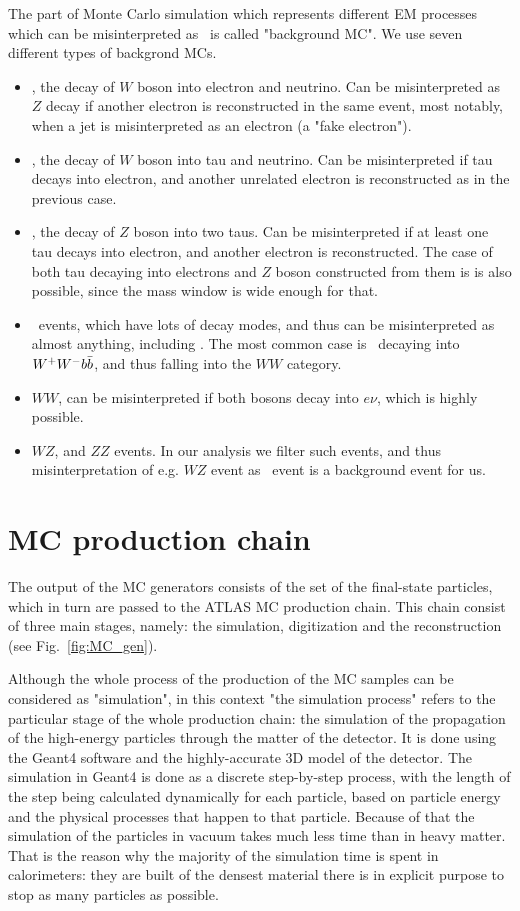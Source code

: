 The part of Monte Carlo simulation which represents different EM processes which can be misinterpreted as \Zee\ is called "background MC". We use seven different types of backgrond MCs.
\begin{itemize}
\item \Wen, the decay of $W$ boson into electron and neutrino. Can be misinterpreted as $Z$ decay if another electron is reconstructed in the same event, most notably, when a jet is misinterpreted as an electron (a "fake electron").
\item \Wtau, the decay of $W$ boson into tau and neutrino. Can be misinterpreted if tau decays into electron, and another unrelated electron is reconstructed as in the previous case.
\item \Ztau, the decay of $Z$ boson into two taus. Can be misinterpreted if at least one tau decays into electron, and another electron is reconstructed. The case of both tau decaying into electrons and $Z$ boson constructed from them is is also possible, since the mass window is wide enough for that.
\item \ttbar\ events, which have lots of decay modes, and thus can be misinterpreted as almost anything, including \Zee. The most common case is \ttbar\ decaying into $W^{+}W^{-}b\bar{b}$, and thus falling into the $WW$ category.
\item $WW$, can be misinterpreted if both bosons decay into $e\nu$, which is highly possible.
\item $WZ$, and $ZZ$ events. In our analysis we filter such events, and thus misinterpretation of e.g. $WZ$ event as \Zee\ event is a background event for us.
\end{itemize}

\section{MC production chain}
\label{sec:MC_sim_rec}

The output of the MC generators consists of the set of the final-state particles, which in turn are passed to the ATLAS MC production chain. This chain consist of three main stages, namely: the simulation, digitization and the reconstruction (see Fig.~\ref{fig:MC_gen}).

Although the whole process of the production of the MC samples can be considered as "simulation", in this context "the simulation process" refers to the particular stage of the whole production chain: the simulation of the propagation of the high-energy particles through the matter of the detector. It is done using the Geant4 software and the highly-accurate 3D model of the detector. The simulation in Geant4 is done as a discrete step-by-step process, with the length of the step being calculated dynamically for each particle, based on particle energy and the physical processes that happen to that particle. Because of that the simulation of the particles in vacuum takes much less time than in heavy matter. That is the reason why the majority of the simulation time is spent in calorimeters: they are built of the densest material there is in explicit purpose to stop as many particles as possible.

